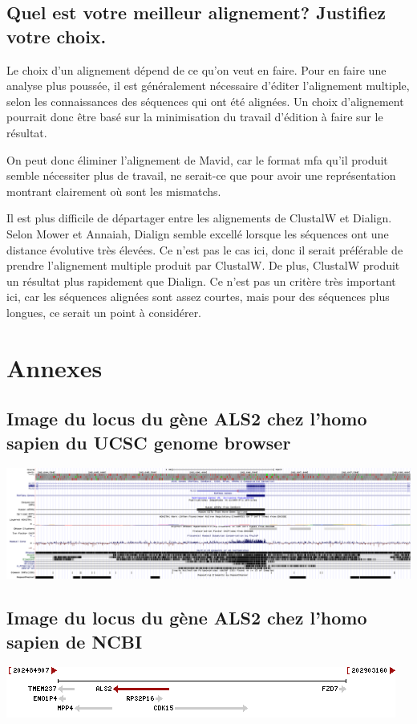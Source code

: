\documentclass[11pt]{article} %
\renewcommand{\thesubsection}{\alph{subsection}}
\begin{document}
\subsection[Meilleur alignement]{Quel est votre meilleur alignement? Justifiez votre choix.}

Le choix d'un alignement dépend de ce qu'on veut en faire. Pour en faire une analyse plus poussée, il est
généralement nécessaire d'éditer l'alignement multiple, selon les connaissances des séquences qui ont été
alignées. Un choix d'alignement pourrait donc être basé sur la minimisation du travail d'édition à faire
sur le résultat.

On peut donc éliminer l'alignement de Mavid, car le format mfa qu'il produit semble nécessiter plus de
travail, ne serait-ce que pour avoir une représentation montrant clairement où sont les mismatchs.

Il est plus difficile de départager entre les alignements de ClustalW et Dialign. Selon Mower et Annaiah, 
Dialign semble excellé lorsque les séquences ont une distance évolutive très élevées. Ce n'est pas le cas
ici, donc il serait préférable de prendre l'alignement multiple produit par ClustalW. De plus, ClustalW
produit un résultat plus rapidement que Dialign. Ce n'est pas un critère très important ici, car
les séquences alignées sont assez courtes, mais pour des séquences plus longues, ce serait un
point à considérer.

\begingroup
\renewcommand{\appendix}{%
    \renewcommand{\thesubsection}{\arabic{subsection}}
}

\newpage
\appendix
\section{Annexes}
\subsection{Image du locus du gène ALS2 chez l'homo sapien du UCSC genome browser}\label{1}
\includegraphics[width=\linewidth]{annexes/annexe1_ucsc.png}

\subsection{Image du locus du gène ALS2 chez l'homo sapien de NCBI}\label{2}
\includegraphics{annexes/annexe1_ncbi_als2.png}
\end{document}
